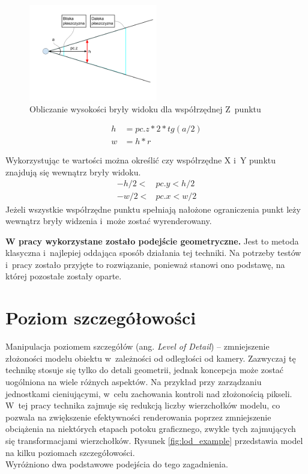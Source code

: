 \documentclass[a4paper,twoside,12pt]{book}
\newcommand{\obcy}[1]{\emph{#1}}
\newcommand{\ang}[1]{{\selectlanguage{british}\obcy{#1}}}
\begin{document}
\begin{figure}[H]
    \centering
    \includegraphics[width=0.5\textwidth]{res/frustrum_radio_h.png}
    \caption{Obliczanie wysokości bryły widoku dla współrzędnej Z~punktu}
    \label{fig:frustrum_radio_h}
\end{figure}

\begin{align}
h &= pc.z * 2 * tg(a/2) \\
w &= h * r
\end{align}

Wykorzystując te wartości można określić czy współrzędne X i~Y punktu znajdują się wewnątrz bryły widoku.
\begin{align}
-h/2 < &pc.y < h/2 \\
-w/2 < &pc.x < w/2
\end{align}
Jeżeli wszystkie współrzędne punktu spełniają nałożone ograniczenia punkt leży wewnątrz bryły widzenia i~może zostać wyrenderowany.

\vbox{}

\textbf{W pracy wykorzystane zostało podejście geometryczne.} Jest to metoda klasyczna i~najlepiej oddająca sposób działania tej techniki. Na potrzeby testów i~pracy zostało przyjęte to rozwiązanie, ponieważ stanowi ono podstawę, na której pozostałe zostały oparte.

\section{Poziom szczegółowości}
Manipulacja poziomem szczegółów (ang. \ang{Level of Detail}) – zmniejszenie złożoności modelu obiektu w~zależności od odległości od kamery. Zazwyczaj tę technikę stosuje się tylko do detali geometrii, jednak koncepcja może zostać uogólniona na wiele różnych aspektów. Na przykład przy zarządzaniu jednostkami cieniującymi, w~celu zachowania kontroli nad złożonością pikseli. W~tej pracy technika zajmuje się redukcją liczby wierzchołków modelu, co pozwala na zwiększenie efektywności renderowania poprzez zmniejszenie obciążenia na niektórych etapach potoku graficznego, zwykle tych zajmujących się transformacjami wierzchołków. Rysunek \ref{fig:lod_example} przedstawia model na kilku poziomach szczegółowości. \\
Wyróżniono dwa podstawowe podejścia do tego zagadnienia. \cite{lod}
\end{document}
